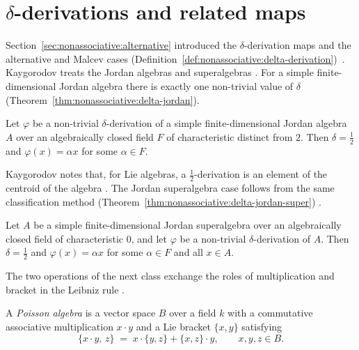 \section{$\delta$-derivations and related maps}\label{sec:nonassociative:delta-quasi-anti}

Section~\ref{sec:nonassociative:alternative} introduced the
$\delta$-derivation maps and the alternative and Malcev cases
(Definition~\ref{def:nonassociative:delta-derivation})~\cite{KacKaygorodov2007Delta}. Kaygorodov treats the
Jordan algebras and superalgebras \cite{KacKaygorodov2007Delta}. For a simple
finite-dimensional Jordan algebra there is exactly one non-trivial value of
$\delta$ (Theorem~\ref{thm:nonassociative:delta-jordan}).

\begin{theorem}
\label{thm:nonassociative:delta-jordan}
Let $\varphi$ be a non-trivial $\delta$-derivation of a simple
finite-dimensional Jordan algebra $A$ over an algebraically closed field
$F$ of characteristic distinct from $2$. Then $\delta=\tfrac12$ and
$\varphi(x)=\alpha x$ for some $\alpha\in F$.
\end{theorem}

Kaygorodov notes that, for Lie algebras, a $\tfrac12$-derivation is an
element of the centroid of the algebra
\cite[Introduction]{KacKaygorodov2007Delta}. The Jordan superalgebra
case follows from the same classification method (Theorem~\ref{thm:nonassociative:delta-jordan-super})
\cite[Theorem~4.4]{KacKaygorodov2007Delta}.\begin{theorem}
\label{thm:nonassociative:delta-jordan-super}
Let $A$ be a simple finite-dimensional Jordan superalgebra over an
algebraically closed field of characteristic $0$, and let $\varphi$ be a
non-trivial $\delta$-derivation of $A$. Then $\delta=\tfrac12$ and
$\varphi(x)=\alpha x$ for some $\alpha\in F$ and all $x\in A$.
\end{theorem}

The two operations of the next class exchange the roles of multiplication and
bracket in the Leibniz rule \cite[p.~657]{AlbertiArestiLi2018Poisson}.

\begin{definition}
\label{def:nonassociative:delta-poisson}
A \emph{Poisson algebra} is a vector space $B$ over a field $k$ with a
commutative associative multiplication $x\cdot y$ and a Lie bracket
$\{x,y\}$ satisfying
\[
\{x\cdot y,\,z\}\;=\;x\cdot\{y,z\}+\{x,z\}\cdot y,
\qquad x,y,z\in B.
\]
\end{definition}

